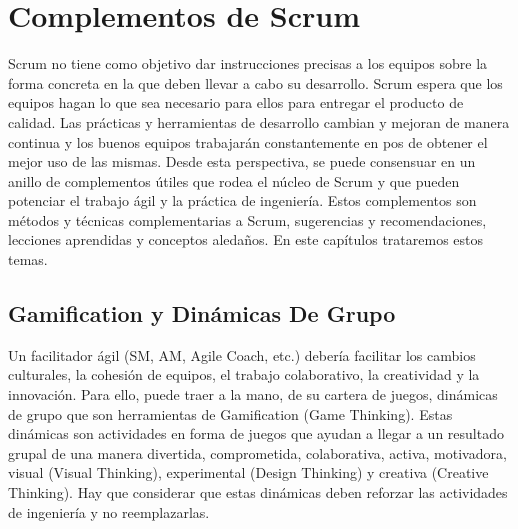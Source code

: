 \chapter{Complementos de Scrum}

Scrum no tiene como objetivo dar instrucciones precisas a los equipos sobre la forma concreta en la que deben llevar a cabo su desarrollo. Scrum espera que los equipos hagan lo que sea necesario para ellos para entregar el producto de calidad. Las prácticas y herramientas de desarrollo cambian y mejoran de manera continua y los buenos equipos trabajarán constantemente en pos de obtener el mejor uso de las mismas. Desde esta perspectiva, se puede consensuar en un anillo de complementos útiles que rodea el núcleo de Scrum y que pueden potenciar el trabajo ágil y la práctica de ingeniería. Estos complementos son métodos y técnicas complementarias a Scrum, sugerencias y recomendaciones, lecciones aprendidas y conceptos aledaños. En este capítulos trataremos estos temas.



\newpage
\section{Gamification y Dinámicas De Grupo}

Un facilitador ágil (SM, AM, Agile Coach, etc.) debería facilitar los cambios culturales, la cohesión de equipos, el trabajo colaborativo, la creatividad y la innovación. Para ello, puede traer a la mano, de su cartera de juegos, dinámicas de grupo que son herramientas de Gamification (Game Thinking). Estas dinámicas son actividades en forma de juegos que ayudan a llegar a un resultado grupal de una manera divertida, comprometida, colaborativa, activa, motivadora, visual (Visual Thinking), experimental (Design Thinking) y creativa (Creative Thinking). Hay que considerar que estas dinámicas deben reforzar las actividades de ingeniería y no reemplazarlas.


